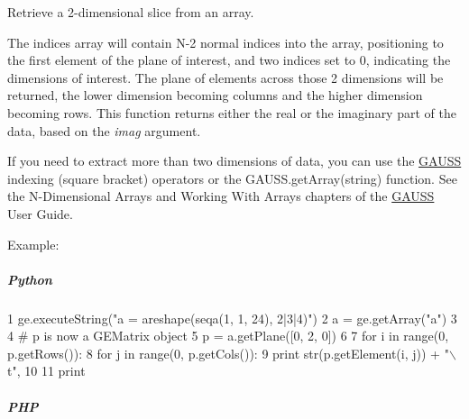 Retrieve a 2-\/dimensional slice from an array. 

The indices array will contain N-\/2 normal indices into the array, positioning to the first element of the plane of interest, and two indices set to 0, indicating the dimensions of interest. The plane of elements across those 2 dimensions will be returned, the lower dimension becoming columns and the higher dimension becoming rows. This function returns either the real or the imaginary part of the data, based on the {\itshape imag} argument.

If you need to extract more than two dimensions of data, you can use the \hyperlink{class_g_a_u_s_s}{G\-A\-U\-S\-S} indexing (square bracket) operators or the G\-A\-U\-S\-S.\-get\-Array(string) function. See the N-\/\-Dimensional Arrays and Working With Arrays chapters of the \hyperlink{class_g_a_u_s_s}{G\-A\-U\-S\-S} User Guide.

Example\-:

\subparagraph*{Python}


\begin{DoxyCode}
1 ge.executeString(\textcolor{stringliteral}{"a = areshape(seqa(1, 1, 24), 2|3|4)"})
2 a = ge.getArray(\textcolor{stringliteral}{"a"})
3 
4 \textcolor{comment}{# p is now a GEMatrix object}
5 p = a.getPlane([0, 2, 0])
6 
7 \textcolor{keywordflow}{for} i \textcolor{keywordflow}{in} range(0, p.getRows()):
8     \textcolor{keywordflow}{for} j \textcolor{keywordflow}{in} range(0, p.getCols()):
9         \textcolor{keywordflow}{print} str(p.getElement(i, j)) + \textcolor{stringliteral}{"\(\backslash\)t"},
10 
11     \textcolor{keywordflow}{print}
\end{DoxyCode}


\subparagraph*{P\-H\-P}


